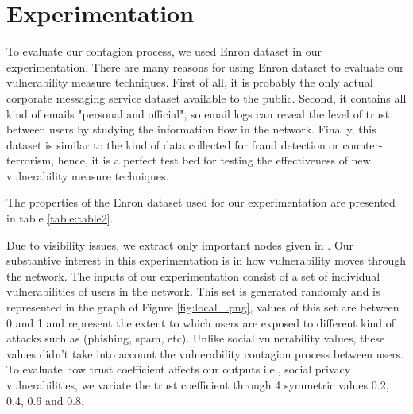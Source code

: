 \section{Experimentation} \label{sec:Experimentation}

To evaluate our contagion process,
	we used Enron dataset in our experimentation.
There are many reasons for using Enron dataset to evaluate our vulnerability measure techniques.
First of all,
	it is probably the only actual corporate messaging service dataset available to the public.
Second,
	it contains all kind of emails "personal and official",
	so email logs can reveal the level of trust between users by studying the information flow in the network.
Finally,
	this dataset is similar to the kind of data collected for fraud detection or counter-terrorism,
	hence,
	it is a perfect test bed for testing the effectiveness of new vulnerability measure techniques.

The properties of the Enron dataset used for our experimentation are presented in table \ref{table:table2}.


Due to visibility issues,
	we extract only important nodes given in \cite{shetty_discovering_2005}.
Our substantive interest in this experimentation is in how vulnerability moves through the network.
The inputs of our experimentation consist of a set of individual vulnerabilities of users in the network.
This set is generated randomly and is represented in the graph of Figure \ref{fig:local_.png},
	values of this set are between 0 and 1 and represent the extent to which users are exposed to different kind of attacks such as (phishing, spam, etc).
Unlike social vulnerability values,
	these values didn't take into account the vulnerability contagion process between users.
To evaluate how trust coefficient affects our outputs i.e., social privacy vulnerabilities,
	we variate the trust coefficient through 4 symmetric values 0.2, 0.4, 0.6 and 0.8.



